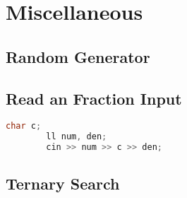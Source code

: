 \chapter{Miscellaneous}

\section{Random Generator}


\section{Read an Fraction Input}

    \begin{lstlisting}[language=c++]
        char c;
        ll num, den;
        cin >> num >> c >> den;
    \end{lstlisting}
    

\section{Ternary Search}

